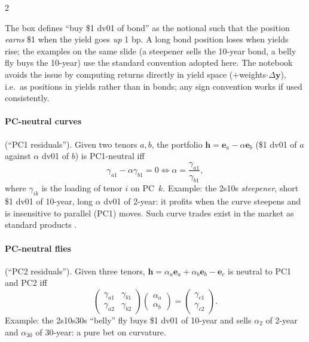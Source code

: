 \begin{paracol}{2}
\begin{coursenote}
The box defines ``buy \$1 dv01 of bond'' as the notional such that the position \emph{earns} \$1 when the yield
goes \emph{up} 1 bp. A long bond position loses when yields rise; the examples on the same slide (a steepener
sells the 10-year bond, a belly fly buys the 10-year) use the standard convention adopted here. The notebook
avoids the issue by computing returns directly in yield space ($+$weights$\cdot\Delta\bm y$), i.e.\ as positions in
yields rather than in bonds; any sign convention works if used consistently.
\end{coursenote}

\paragraph{PC-neutral curves} (``PC1 residuals''). Given two tenors $a,b$, the portfolio $\bm h=\bm e_a-\alpha\bm e_b$
(\$1 dv01 of $a$ against $\alpha$ dv01 of $b$) is PC1-neutral iff
\begin{equation}\label{ch07:eq-curve}
  \gamma_{a1}-\alpha\gamma_{b1}=0\iff\alpha=\frac{\gamma_{a1}}{\gamma_{b1}},
\end{equation}
where $\gamma_{ik}$ is the loading of tenor $i$ on PC~$k$. Example: the 2s10s \emph{steepener}, short \$1 dv01 of
10-year, long $\alpha$ dv01 of 2-year: it profits when the curve steepens and is insensitive to parallel (PC1) moves.
Such curve trades exist in the market as standard products .

\paragraph{PC-neutral flies} (``PC2 residuals''). Given three tenors, $\bm h=\alpha_a\bm e_a+\alpha_b\bm e_b-\bm e_c$ is neutral
to PC1 and PC2 iff
\begin{equation}\label{ch07:eq-fly}
  \begin{pmatrix}\gamma_{a1}&\gamma_{b1}\\ \gamma_{a2}&\gamma_{b2}\end{pmatrix}
  \begin{pmatrix}\alpha_a\\ \alpha_b\end{pmatrix}=\begin{pmatrix}\gamma_{c1}\\ \gamma_{c2}\end{pmatrix}.
\end{equation}
Example: the 2s10s30s ``belly'' fly buys \$1 dv01 of 10-year and sells $\alpha_2$ of 2-year and $\alpha_{30}$ of
30-year: a pure bet on curvature.


\end{paracol}
